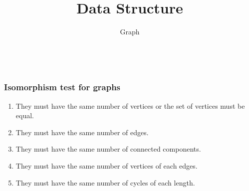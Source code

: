 \documentclass[9 pt]{beamer}
\title[Graph Theory]{Data Structure}
\subtitle{Graph}
\author[S. I. Kiron]
{
	\myName \\
	\href{mailto:\myMail}{\myMail}
}
\date[Monday]{\dateOfCreate}
\institute[BSMRSTU]{\varsityName}
\affil{Department of CSE}
\begin{document}
\begin{frame}
    \frametitle{Isomorphism test for graphs}
    
    \begin{enumerate}
    	\item They must have the same number of vertices or the set of vertices must be equal.
    	\item They must have the same number of edges.
    	\item They must have the same number of connected components.
    	\item They must have the same number of vertices of each edges.
    	\item They must have the same number of cycles of each length.
    \end{enumerate}
\end{frame}
\end{document}
